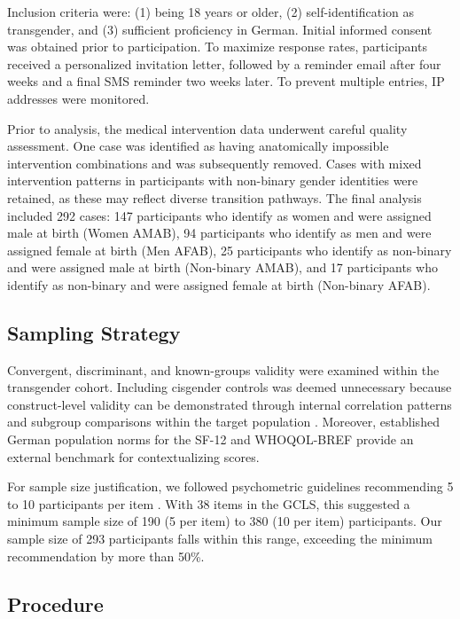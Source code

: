 \documentclass[12pt,a4paper]{article}
\begin{document}
Inclusion criteria were: (1) being 18 years or older, (2) self-identification as transgender, and (3) sufficient proficiency in German. Initial informed consent was obtained prior to participation. To maximize response rates, participants received a personalized invitation letter, followed by a reminder email after four weeks and a final SMS reminder two weeks later. To prevent multiple entries, IP addresses were monitored.

Prior to analysis, the medical intervention data underwent careful quality assessment. One case was identified as having anatomically impossible intervention combinations and was subsequently removed. Cases with mixed intervention patterns in participants with non-binary gender identities were retained, as these may reflect diverse transition pathways. The final analysis included 292 cases: 147 participants who identify as women and were assigned male at birth (Women AMAB), 94 participants who identify as men and were assigned female at birth (Men AFAB), 25 participants who identify as non-binary and were assigned male at birth (Non-binary AMAB), and 17 participants who identify as non-binary and were assigned female at birth (Non-binary AFAB).

\subsection{Sampling Strategy}

Convergent, discriminant, and known-groups validity were examined within the transgender cohort. Including cisgender controls was deemed unnecessary because construct-level validity can be demonstrated through internal correlation patterns and subgroup comparisons within the target population \parencite{Kline2015}. Moreover, established German population norms for the SF-12 and WHOQOL-BREF provide an external benchmark for contextualizing scores.

For sample size justification, we followed psychometric guidelines recommending 5 to 10 participants per item \parencite{deVet2011, Costello2005}. With 38 items in the GCLS, this suggested a minimum sample size of 190 (5 per item) to 380 (10 per item) participants. Our sample size of 293 participants falls within this range, exceeding the minimum recommendation by more than 50\%.

\subsection{Procedure}
\end{document}
